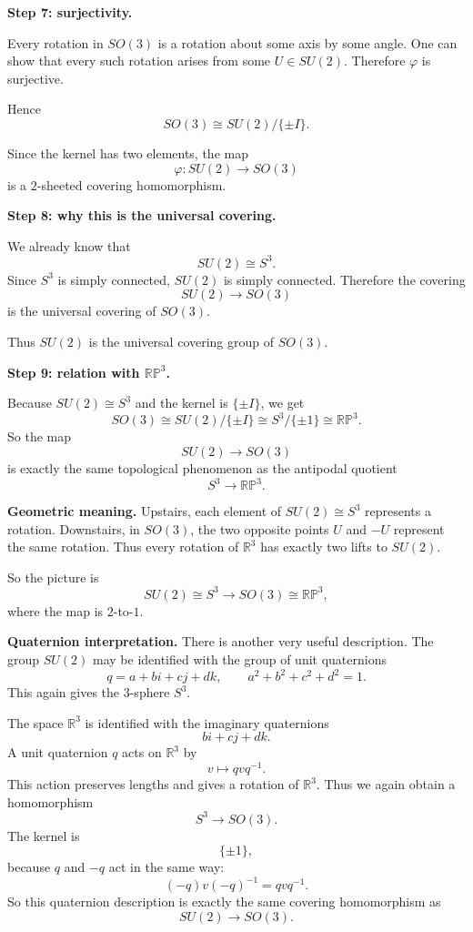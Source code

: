 \documentclass[12pt,a4paper]{article}
\theoremstyle{notespace}
\begin{document}
\medskip

\textbf{Step 7: surjectivity.}

Every rotation in \(SO(3)\) is a rotation about some axis by some angle. One can show that every such rotation arises from some \(U\in SU(2)\). Therefore \(\varphi\) is surjective.

Hence
\[
SO(3)\cong SU(2)/\{\pm I\}.
\]

Since the kernel has two elements, the map
\[
\varphi:SU(2)\to SO(3)
\]
is a \(2\)-sheeted covering homomorphism.

\medskip

\textbf{Step 8: why this is the universal covering.}

We already know that
\[
SU(2)\cong S^3.
\]
Since \(S^3\) is simply connected, \(SU(2)\) is simply connected. Therefore the covering
\[
SU(2)\to SO(3)
\]
is the universal covering of \(SO(3)\).

Thus \(SU(2)\) is the universal covering group of \(SO(3)\).

\medskip

\textbf{Step 9: relation with \(\mathbb{RP}^3\).}

Because \(SU(2)\cong S^3\) and the kernel is \(\{\pm I\}\), we get
\[
SO(3)\cong SU(2)/\{\pm I\}\cong S^3/\{\pm 1\}\cong \mathbb{RP}^3.
\]
So the map
\[
SU(2)\to SO(3)
\]
is exactly the same topological phenomenon as the antipodal quotient
\[
S^3\to \mathbb{RP}^3.
\]

\medskip

\textbf{Geometric meaning.}
Upstairs, each element of \(SU(2)\cong S^3\) represents a rotation. Downstairs, in \(SO(3)\), the two opposite points \(U\) and \(-U\) represent the same rotation. Thus every rotation of \(\mathbb R^3\) has exactly two lifts to \(SU(2)\).

So the picture is
\[
SU(2)\cong S^3
\longrightarrow
SO(3)\cong \mathbb{RP}^3,
\]
where the map is \(2\)-to-\(1\).

\medskip

\textbf{Quaternion interpretation.}
There is another very useful description. The group \(SU(2)\) may be identified with the group of unit quaternions
\[
q=a+bi+cj+dk,
\qquad
a^2+b^2+c^2+d^2=1.
\]
This again gives the \(3\)-sphere \(S^3\).

The space \(\mathbb R^3\) is identified with the imaginary quaternions
\[
bi+cj+dk.
\]
A unit quaternion \(q\) acts on \(\mathbb R^3\) by
\[
v\longmapsto qvq^{-1}.
\]
This action preserves lengths and gives a rotation of \(\mathbb R^3\). Thus we again obtain a homomorphism
\[
S^3\to SO(3).
\]
The kernel is
\[
\{\pm 1\},
\]
because \(q\) and \(-q\) act in the same way:
\[
(-q)v(-q)^{-1}=qvq^{-1}.
\]
So this quaternion description is exactly the same covering homomorphism as
\[
SU(2)\to SO(3).
\]
\end{document}
